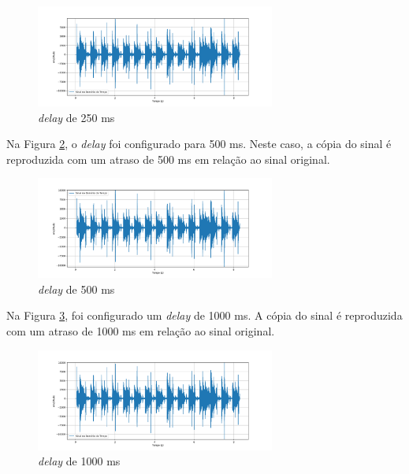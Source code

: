 \begin{figure}[h]
	\centering
    \includegraphics[width=0.7\textwidth]{figuras/fig75.png}
	\caption{\textit{delay} de 250 ms}
	\label{fig75}
\end{figure}

Na Figura \ref{fig76}, o \textit{delay} foi configurado para 500 ms. Neste caso, a cópia do sinal é reproduzida com um atraso de 500 ms em relação ao sinal original.

\begin{figure}[h]
	\centering
    \includegraphics[width=0.7\textwidth]{figuras/fig76.png}
	\caption{\textit{delay} de 500 ms}
	\label{fig76}
\end{figure}

Na Figura \ref{fig77}, foi configurado um \textit{delay} de 1000 ms. A cópia do sinal é reproduzida com um atraso de 1000 ms em relação ao sinal original.

\begin{figure}[h]
	\centering
    \includegraphics[width=0.7\textwidth]{figuras/fig77.png}
	\caption{\textit{delay} de 1000 ms}
	\label{fig77}
\end{figure}
